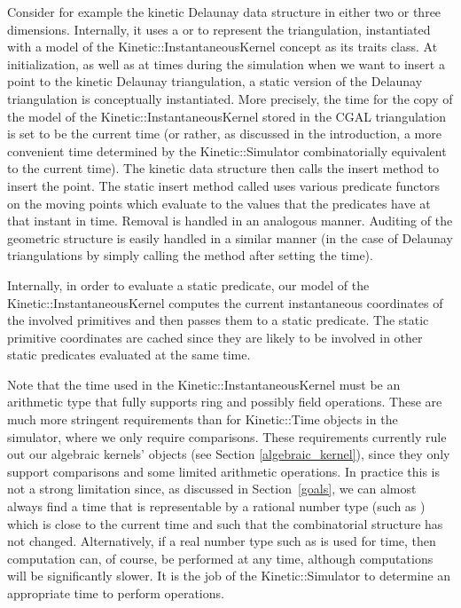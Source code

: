 Consider for example the kinetic Delaunay data structure in either two
or three dimensions.  Internally, it uses a
 or
 to represent the
triangulation, instantiated with a model of the
Kinetic::InstantaneousKernel concept as its traits class.  At
initialization, as well as at times during the simulation when we want
to insert a point to the kinetic Delaunay triangulation, a static
version of the Delaunay triangulation is conceptually instantiated.
More precisely, the time for the copy of the model of the
Kinetic::InstantaneousKernel stored in the CGAL triangulation is set
to be the current time (or rather, as discussed in the introduction, a
more convenient time determined by the Kinetic::Simulator
combinatorially equivalent to the current time).  The kinetic data
structure then calls the
 insert
method to insert the point.  The static insert method called uses
various predicate functors on the moving points which evaluate to the
values that the predicates have at that instant in time. Removal is
handled in an analogous manner. Auditing of the geometric structure is
easily handled in a similar manner (in the case of Delaunay
triangulations by simply calling the  method after
setting the time).

Internally, in order to evaluate a static predicate, our model of the
Kinetic::InstantaneousKernel computes the current instantaneous
coordinates of the involved primitives and then passes them to a
static predicate. The static primitive coordinates are cached since
they are likely to be involved in other static predicates evaluated at
the same time.


Note that the time used in the Kinetic::InstantaneousKernel must be an
arithmetic type that fully supports ring and possibly field
operations.  These are much more stringent requirements than for
Kinetic::Time objects in the simulator, where we only require
comparisons. These requirements currently rule out our algebraic
kernels'  objects (see Section \ref{algebraic_kernel}),
since they only support comparisons and some limited arithmetic
operations. In practice this is not a strong limitation since, as
discussed in Section~\ref{goals}, we can almost always find a time
that is representable by a rational number type (such as
) which is close to the current time and such
that the combinatorial structure has not changed. Alternatively, if a
real number type such as  is used for time, then
computation can, of course, be performed at any time, although
computations will be significantly slower.
It is the job of the Kinetic::Simulator to determine an appropriate
time to perform operations.


